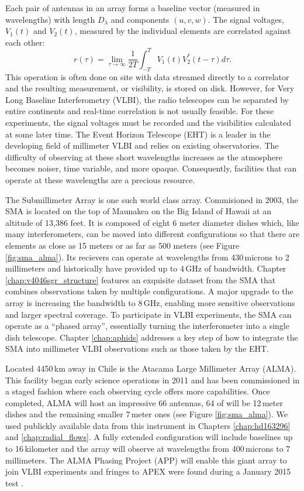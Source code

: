 Each pair of antennas in an array forms a baseline vector (measured in wavelengths) with length $D_\lambda$ and 
components $(u,v,w)$.  The signal voltages, $V_1(t)$ and $V_2(t)$, measured by the individual 
elements are correlated against each other:
\begin{equation}
r(\tau) = \lim_{\tau \to \infty} \frac{1}{2T} \int_{-T}^T V_1(t) V_2^\ast(t-\tau) d\tau.
\end{equation}
This operation is often done on site with data streamed directly to a correlator and the resulting 
measurement, or visibility, is stored on disk.  However, for Very Long Baseline Interferometry (VLBI), the 
radio telescopes can be separated by entire continents and real-time correlation is not usually feasible.  For 
these experiments, the signal voltages must be recorded and the visibilities calculated at some later time.  The 
Event Horizon Telescope (EHT) is a leader in the developing field of millimeter VLBI and relies on existing 
observatories.  The difficulty of observing at these short wavelengths increases as the atmosphere becomes 
noiser, time variable, and more opaque.  Consequently, facilities that can operate at these wavelengths are a 
precious resource.

The Submillimeter Array \citep[SMA][]{ho04} is one such world class array.  Commisioned in 2003, the SMA is 
located on the top of Maunakea on the Big Island of Hawaii at an altitude of 13,386 feet.
It is composed of eight 6 meter diameter dishes which, like many interferometers, can be moved into different 
configurations so that there are elements as close as 15 meters or as far as 500 meters (see Figure 
\ref{fig:sma_alma}).  Its recievers can operate at wavelengths from 430\,microns to 2\,millimeters and 
historically have provided up to 4\,GHz of bandwidth.  Chapter \ref{chap:v4046sgr_structure} features an 
exquisite dataset from the SMA that combines observations taken by multiple configurations.  A major upgrade to 
the array is increasing the bandwidth to 8\,GHz, enabling more sensitive observations and larger spectral 
coverage.  To participate in VLBI experiments, the SMA can operate as a ``phased array'', essentially turning 
the interferometer into a single dish telescope.  Chapter \ref{chap:aphids} addresses a key step of how to 
integrate the SMA into millimeter VLBI observations such as those taken by the EHT.

Located 4450\,km away in Chile is the Atacama Large Millimeter Array (ALMA).  This facility began early
science operations in 2011 and has been commissioned in a staged fashion where each observing cycle offers more 
capabilities.  Once completed, ALMA will host an impressive 66 antennas, 64 of will be 12\,meter dishes and
the remaining smaller 7\,meter ones (see Figure \ref{fig:sma_alma}).  We used publickly available data from 
this instrument in Chapters \ref{chap:hd163296} and \ref{chap:radial_flows}.  A fully extended configuration 
will include baselines up to 16\,kilometer and the array will observe at wavelengths from 400\,microns to 
7\,millimeters.  The ALMA Phasing Project (APP) will enable this giant array to join VLBI experiments and 
fringes to APEX were found during a January 2015 test \citep{matthews15}.

